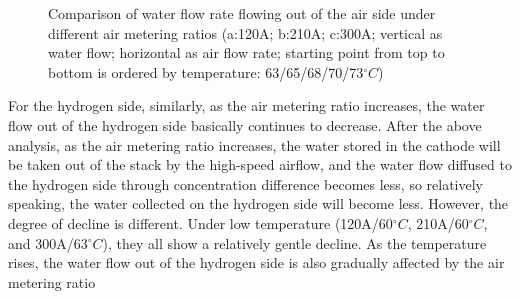 \begin{figure}
{	}
	\caption{Comparison of water flow rate flowing out of the air side under different air metering ratios (a:120A; b:210A; c:300A; vertical as water flow; horizontal as air flow rate; starting point from top to bottom is ordered by temperature: 63/65/68/70/73$^{\circ}C$)}
\end{figure}
\par
For the hydrogen side, similarly, as the air metering ratio increases, the water flow out of the hydrogen side basically continues to decrease. After the above analysis, as the air metering ratio increases, the water stored in the cathode will be taken out of the stack by the high-speed airflow, and the water flow diffused to the hydrogen side through concentration difference becomes less, so relatively speaking, the water collected on the hydrogen side will become less. However, the degree of decline is different. Under low temperature (120A/60$^{\circ}C$, 210A/60$^{\circ}C$, and 300A/63$^{\circ}C$), they all show a relatively gentle decline. As the temperature rises, the water flow out of the hydrogen side is also gradually affected by the air metering ratio

